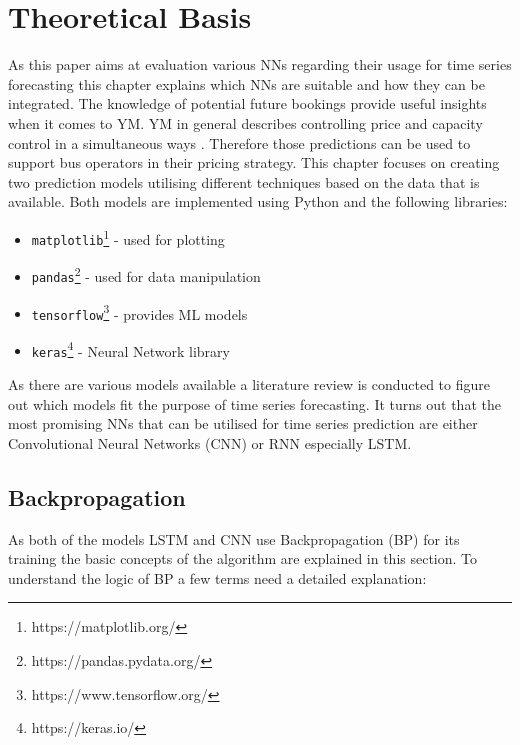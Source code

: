 %
%
% 
% 
% 



\chapter{Theoretical Basis}
\label{chap:theory_basis}
As this paper aims at evaluation various NNs regarding their usage for time series forecasting this chapter explains which NNs are suitable and how they can be integrated. The knowledge of potential future bookings provide useful insights when it comes to YM. YM in general describes controlling price and capacity control in a simultaneous ways \cite{yield_m}. Therefore those predictions can be used to support bus operators in their pricing strategy. This chapter focuses on creating two prediction models utilising different techniques based on the data that is available. 
Both models are implemented using Python and the following libraries:
\begin{itemize}
\item  \verb|matplotlib|\footnote{https://matplotlib.org/} - used for plotting
\item \verb|pandas|\footnote{https://pandas.pydata.org/} - used for data manipulation 
\item \verb|tensorflow|\footnote{https://www.tensorflow.org/} - provides ML models
\item \verb|keras|\footnote{https://keras.io/} - Neural Network library
\end{itemize}

As there are various models available a literature review is conducted to figure out which models fit the purpose of time series forecasting. It turns out that the most promising NNs that can be utilised for time series prediction are either Convolutional Neural Networks (CNN) or RNN especially LSTM\cite{nn_1}\cite{nn_2}\cite{lstm_1}\cite{lstm_2}\cite{rnn_time_series_predict}.

\section{Backpropagation}
\label{sec:bp}

As both of the models LSTM and CNN use Backpropagation (BP) for its training the basic concepts of the algorithm are explained in this section. To understand the logic of BP a few terms need a detailed explanation: 
